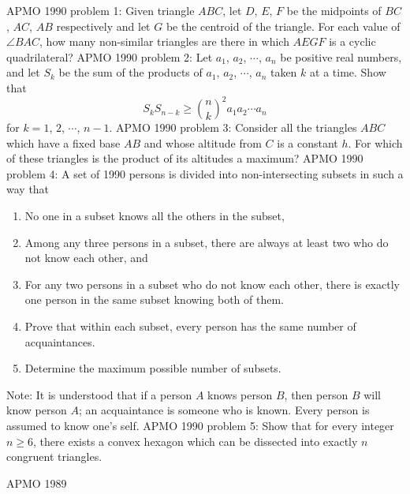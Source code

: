 APMO 1990 problem 1:  Given triangle $ABC$, let $D$, $E$, $F$ be the midpoints of $BC$, $AC$, $AB$ respectively and let $G$ be the centroid of the triangle. For each value of $\angle BAC$, how many non-similar triangles are there in which $AEGF$ is a cyclic quadrilateral? 
APMO 1990 problem 2:  Let $a_1$, $a_2$, $\cdots$, $a_n$ be positive real numbers, and let $S_k$ be the sum of the products of $a_1$, $a_2$, $\cdots$, $a_n$ taken $k$ at a time.  Show that
\[ S_k S_{n-k} \geq {n \choose k}^2 a_1 a_2 \cdots a_n \]
for $k = 1$, $2$, $\cdots$, $n - 1$. 
APMO 1990 problem 3:  Consider all the triangles $ABC$ which have a fixed base $AB$ and whose altitude from $C$ is a constant $h$.  For which of these triangles is the product of its altitudes a maximum? 
APMO 1990 problem 4:  A set of 1990 persons is divided into non-intersecting subsets in such a way that
\begin{enumerate}
  \item No one in a subset knows all the others in the subset,
  \item Among any three persons in a subset, there are always at least two who do not know each other, and
  \item For any two persons in a subset who do not know each other, there is exactly one person in the same subset knowing both of them.
  \item Prove that within each subset, every person has the same number of acquaintances.
  \item Determine the maximum possible number of subsets.
\end{enumerate}
Note: It is understood that if a person $A$ knows person $B$, then person $B$ will know person $A$; an acquaintance is someone who is known.  Every person is assumed to know one's self. 
APMO 1990 problem 5:  Show that for every integer $n \geq 6$, there exists a convex hexagon which can be dissected into exactly $n$ congruent triangles. 

APMO 1989 


